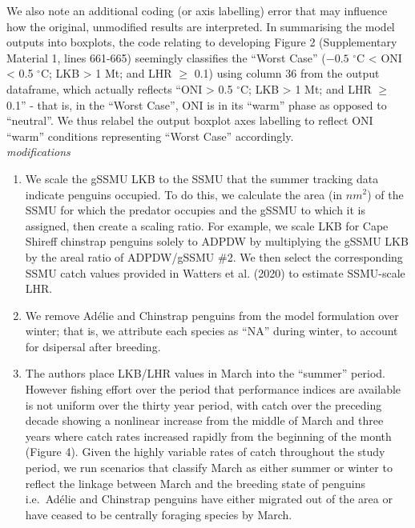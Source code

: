\documentclass[]{elsarticle} %
\providecommand{\tightlist}{%
  \setlength{\itemsep}{0pt}\setlength{\parskip}{0pt}}
\begin{document}
We also note an additional coding (or axis labelling) error that may
influence how the original, unmodified results are interpreted. In
summarising the model outputs into boxplots, the code relating to
developing Figure 2 (Supplementary Material 1, lines 661-665) seemingly
classifies the ``Worst Case'' (\({-0.5}\) \(^{\circ}\)C \textless{} ONI
\textless{} 0.5 \(^{\circ}\)C; LKB \textgreater{} 1 Mt; and LHR
\(\geqslant\) 0.1) using column 36 from the output dataframe, which
actually reflects ``ONI \textgreater{} 0.5 \(^{\circ}\)C; LKB
\textgreater{} 1 Mt; and LHR \(\geqslant\) 0.1'' - that is, in the
``Worst Case'', ONI is in its ``warm'' phase as opposed to ``neutral''.
We thus relabel the output boxplot axes labelling to reflect ONI
``warm'' conditions representing ``Worst Case'' accordingly.\\
\newline \emph{modifications}

\begin{enumerate}
\def\labelenumi{\arabic{enumi}.}
\tightlist
\item
  We scale the gSSMU LKB to the SSMU that the summer tracking data
  indicate penguins occupied. To do this, we calculate the area (in
  \(nm^2\)) of the SSMU for which the predator occupies and the gSSMU to
  which it is assigned, then create a scaling ratio. For example, we
  scale LKB for Cape Shireff chinstrap penguins solely to ADPDW by
  multiplying the gSSMU LKB by the areal ratio of ADPDW/gSSMU \#2. We
  then select the corresponding SSMU catch values provided in Watters et
  al. (2020) to estimate SSMU-scale LHR.
\item
  We remove Adélie and Chinstrap penguins from the model formulation
  over winter; that is, we attribute each species as ``NA'' during
  winter, to account for dsipersal after breeding.
\item
  The authors place LKB/LHR values in March into the ``summer'' period.
  However fishing effort over the period that performance indices are
  available is not uniform over the thirty year period, with catch over
  the preceding decade showing a nonlinear increase from the middle of
  March and three years where catch rates increased rapidly from the
  beginning of the month (Figure 4). Given the highly variable rates of
  catch throughout the study period, we run scenarios that classify
  March as either summer or winter to reflect the linkage between March
  and the breeding state of penguins i.e.~Adélie and Chinstrap penguins
  have either migrated out of the area or have ceased to be centrally
  foraging species by March.
\end{enumerate}
\end{document}
